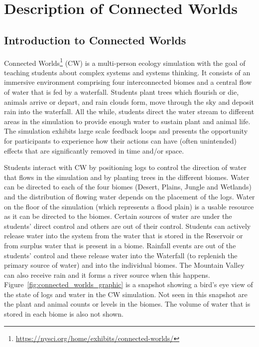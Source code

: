 \section{Description of Connected Worlds}\label{sec:connected_worlds}

\subsection{Introduction to Connected Worlds}\label{sec:connected_worlds_intro}
Connected Worlds\footnote{\url{https://nysci.org/home/exhibits/connected-worlds/}} (CW) is a multi-person ecology simulation with the goal of teaching students about complex systems and systems thinking.  It consists of an immersive environment comprising four interconnected biomes and a central flow of water that is fed by a waterfall. Students plant trees which flourish or die, animals arrive or depart, and rain clouds form, move through the sky and deposit rain into the waterfall. All the while, students direct the water stream to different areas in the simulation to provide enough water to sustain plant and animal life. The simulation exhibits large scale feedback loops and presents the opportunity for participants to experience how their actions can have (often unintended) effects that are significantly removed in time and/or space.

Students interact with CW by positioning logs to control the direction of water that flows in the simulation and by planting trees in the different biomes. Water can be directed to each of the four biomes (Desert, Plains, Jungle and Wetlands) and the distribution of flowing water depends on the placement of the logs. Water on the floor of the simulation (which represents a flood plain) is a usable resource as it can be directed to the biomes. Certain sources of water are under the students' direct control and others are out of their control. Students can actively release water into the system from the water that is stored in the Reservoir or from surplus water that is present in a biome. Rainfall events are out of the students' control and these release water into the Waterfall (to replenish the primary source of water) and into the individual biomes. The Mountain Valley can also receive rain and it forms a river source when this happens. Figure~\ref{fig:connected_worlds_graphic} is a snapshot showing a bird's eye view of the state of logs and water in the CW simulation. Not seen in this snapshot are the plant and animal counts or levels in the biomes. The volume of water that is stored in each biome is also not shown.

